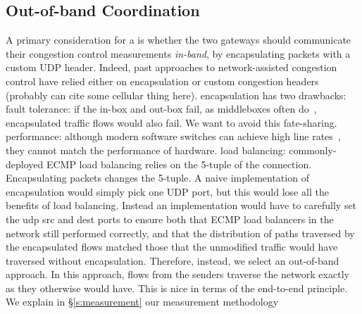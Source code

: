 \subsection{Out-of-band Coordination}\label{s:design:oob}
\begin{outline}
\1 A primary consideration for a \name is whether the two gateways should communicate their congestion control measurements \emph{in-band}, by encapsulating packets with \eg a custom UDP header.
\1 Indeed, past approaches to network-assisted congestion control have relied either on encapsulation or custom congestion headers~\cite{xcp, rcp} (probably can cite some cellular thing here).
\1 encapsulation has two drawbacks:
    \2 fault tolerance: if the in-box and out-box fail, as middleboxes often do~\cite{aplomb}, encapsulated traffic flows would also fail. We want to avoid this fate-sharing.
    \2 performance: although modern software switches can achieve high line rates~\cite{netbricks, bess}, they cannot match the performance of hardware.  
    \2 load balancing: commonly-deployed ECMP load balancing relies on the 5-tuple of the connection. Encapsulating packets changes the 5-tuple. 
        \3 A naive implementation of encapsulation would simply pick one UDP port, but this would lose all the benefits of load balancing. 
        \3 Instead an implementation would have to carefully set the udp src and dest ports to ensure both that ECMP load balancers in the network still performed correctly, and that the distribution of paths traversed by the encapsulated flows matched those that the unmodified traffic would have traversed without encapsulation.
\1 Therefore, instead, we select an out-of-band approach. In this approach, flows from the senders traverse the network exactly as they otherwise would have. This is nice in terms of the end-to-end principle.
\1 We explain in \S\ref{s:measurement} our measurement methodology
\end{outline}

